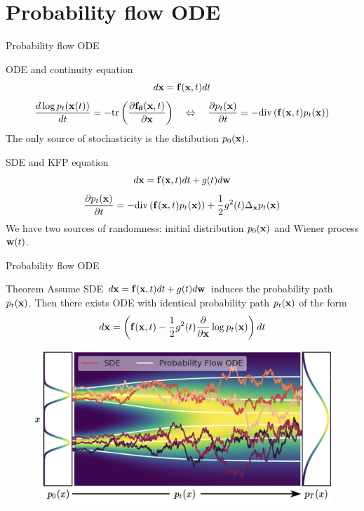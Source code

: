 \section{Probability flow ODE}
\begin{frame}{Probability flow ODE}
	\begin{block}{ODE and continuity equation}
		\vspace{-0.3cm}
		\[
			d\mathbf{x} = \mathbf{f}(\mathbf{x}, t) dt
		\]
		\[
			\frac{d \log p_t(\mathbf{x}(t))}{d t} = - \text{tr} \left( \frac{\partial \mathbf{f}_{\boldsymbol{\theta}}(\mathbf{x}, t)}{\partial \mathbf{x}} \right) 
			\quad  \Leftrightarrow  \quad 
 			\frac{\partial p_t(\mathbf{x})}{\partial t} = - \text{div}\left(\mathbf{f}(\mathbf{x}, t) p_t(\mathbf{x})\right)
 		\]
 		The only source of stochasticity is the distibution $p_0(\mathbf{x})$.
	\end{block}
	\begin{block}{SDE and KFP equation}
		\vspace{-0.3cm}
		\[
			d\mathbf{x} = \mathbf{f}(\mathbf{x}, t) dt + g(t) d \mathbf{w}
		\]
 		\[
 			\frac{\partial p_t(\mathbf{x})}{\partial t} = - \text{div}\left(\mathbf{f}(\mathbf{x}, t) p_t(\mathbf{x})\right) + \frac{1}{2}g^2(t) \Delta_{\mathbf{x}}p_t(\mathbf{x})
 		\]
 		We have two sources of randomness: initial distribution $p_0(\mathbf{x})$ and Wiener process $\mathbf{w}(t)$.
	\end{block}
\end{frame}
\begin{frame}{Probability flow ODE}
	\begin{block}{Theorem}
		Assume SDE $d\mathbf{x} = \mathbf{f}(\mathbf{x}, t) dt + g(t) d \mathbf{w}$ induces the probability path~$p_t(\mathbf{x})$.
		Then there exists ODE with identical probability path $p_t(\mathbf{x})$ of the form
		\vspace{-0.3cm}
		\[
			d\mathbf{x} = \left(\mathbf{f}(\mathbf{x}, t) -\frac{1}{2} g^2(t) \frac{\partial}{\partial \mathbf{x}} \log p_t(\mathbf{x}) \right) dt
		\]
		\vspace{-0.7cm}
	\end{block}
	\begin{figure}
		\includegraphics[width=0.75\linewidth]{figs/probability_flow}
	\end{figure}
\end{frame}
